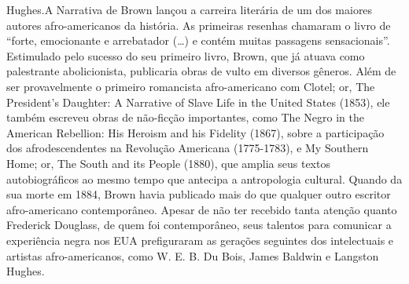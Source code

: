 {{Hughes.}{A Narrativa de Brown lançou a carreira literária de um dos maiores autores afro-americanos da história. As primeiras resenhas chamaram o livro de ``forte, emocionante e arrebatador (\ldots{}) e contém muitas passagens sensacionais''. Estimulado pelo sucesso do seu primeiro livro, Brown, que já atuava como palestrante abolicionista, publicaria obras de vulto em diversos gêneros. Além de ser provavelmente o primeiro romancista afro-americano com Clotel; or, The President's Daughter: A Narrative of Slave Life in the United States (1853), ele também escreveu obras de não-ficção importantes, como The Negro in the American Rebellion: His Heroism and his Fidelity (1867), sobre a participação dos afrodescendentes na Revolução Americana (1775-1783), e My Southern Home; or, The South and its People (1880), que amplia seus textos autobiográficos ao mesmo tempo que antecipa a antropologia cultural. Quando da sua morte em 1884, Brown havia publicado mais do que qualquer outro escritor afro-americano contemporâneo. Apesar de não ter recebido tanta atenção quanto Frederick Douglass, de quem foi contemporâneo, seus talentos para comunicar a experiência negra nos EUA prefiguraram as gerações seguintes dos intelectuais e artistas afro-americanos, como W. E. B. Du Bois, James Baldwin e Langston Hughes.}}\label{a-narrativa-de-brown-lanuxe7ou-a-carreira-literuxe1ria-de-um-dos-maiores-autores-afro-americanos-da-histuxf3ria.-as-primeiras-resenhas-chamaram-o-livro-de-forte-emocionante-e-arrebatador-e-contuxe9m-muitas-passagens-sensacionais.-estimulado-pelo-sucesso-do-seu-primeiro-livro-brown-que-juxe1-atuava-como-palestrante-abolicionista-publicaria-obras-de-vulto-em-diversos-guxeaneros.-aluxe9m-de-ser-provavelmente-o-primeiro-romancista-afro-americano-com-clotel-or-the-presidents-daughter-a-narrative-of-slave-life-in-the-united-states-1853-ele-tambuxe9m-escreveu-obras-de-nuxe3o-ficuxe7uxe3o-importantes-como-the-negro-in-the-american-rebellion-his-heroism-and-his-fidelity-1867-sobre-a-participauxe7uxe3o-dos-afrodescendentes-na-revoluuxe7uxe3o-americana-1775-1783-e-my-southern-home-or-the-south-and-its-people-1880-que-amplia-seus-textos-autobiogruxe1ficos-ao-mesmo-tempo-que-antecipa-a-antropologia-cultural.-quando-da-sua-morte-em-1884-brown-havia-publicado-mais-do-que-qualquer-outro-escritor-afro-americano-contemporuxe2neo.-apesar-de-nuxe3o-ter-recebido-tanta-atenuxe7uxe3o-quanto-frederick-douglass-de-quem-foi-contemporuxe2neo-seus-talentos-para-comunicar-a-experiuxeancia-negra-nos-eua-prefiguraram-as-gerauxe7uxf5es-seguintes-dos-intelectuais-e-artistas-afro-americanos-como-w.-e.-b.-du-bois-james-baldwin-e-langston-hughes.}

